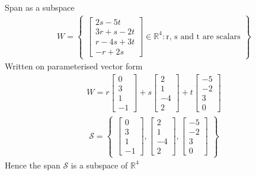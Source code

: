 \begin{example}{Span as a subspace}
\begin{align*}
    W = \begin{Bmatrix}
    \begin{bmatrix}
    2s-5t\\3r+s-2t\\r-4s+3t\\-r+2s
    \end{bmatrix}
        \in \mathbb{R}^4:\text{r, s and t are scalars}
    \end{Bmatrix}
\end{align*}
Written on parameterised vector form
\begin{align*}
    W =
    r \begin{bmatrix}
        0 \\ 3 \\1 \\ -1
    \end{bmatrix}
    +s\begin{bmatrix}
        2 \\ 1 \\ -4 \\ 2
    \end{bmatrix}
    +t\begin{bmatrix}
        -5 \\ -2 \\ 3 \\ 0
    \end{bmatrix}
\end{align*}
\begin{align*}
    \mathcal{S}=
    \begin{Bmatrix}
    \begin{bmatrix}
        0 \\ 3 \\1 \\ -1
    \end{bmatrix}, 
    \begin{bmatrix}
        2 \\ 1 \\ -4 \\ 2
    \end{bmatrix},
    \begin{bmatrix}
        -5 \\ -2 \\ 3 \\ 0
    \end{bmatrix}
    \end{Bmatrix}
\end{align*}
Hence the span $\mathcal{S}$ is a subspace of $\mathbb{R}^4$
\end{example}


